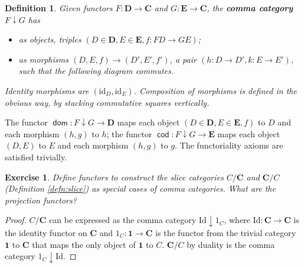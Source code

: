 \documentclass[a5paper,oneside,11pt]{article}
\newtheorem{ex}{Exercise}
\newtheorem{defn}{Definition}
\newcommand\id{\mathord{\mathrm{id}}}
\newcommand\Id{\mathord{\mathrm{Id}}}
\newcommand\1{\mathord{\mathrm{1}}}
\newcommand\cat[1]{\mathbf{#1}}
\newcommand\dom{\mathop{\mathsf{dom}}}
\newcommand\cod{\mathop{\mathsf{cod}}}
\begin{document}
\begin{defn}
\label{defn:comma}
Given functors $F : \cat{D} \longrightarrow \cat{C}$ and $G : \cat{E} \longrightarrow \cat{C}$,
the \textbf{comma category} $F \downarrow G$ has
\begin{itemize}
    \item as objects, triples $(D \in \cat{D}, E \in \cat{E}, f : F D  \rightarrow G E)$;
    \item as morphisms $(D, E, f) \rightarrow (D', E', f')$, a pair
        $(h : D \rightarrow D', k : E \rightarrow E')$, such that the following diagram
        commutes.
        \begin{figure}[H]
            \centering
        \end{figure}
\end{itemize}
Identity morphisms are $(\id_D, \id_E)$.
Composition of morphisms is defined in the obvious way, by stacking commutative
squares vertically.
\end{defn}
The functor $\dom : F \downarrow G \longrightarrow \cat{D}$ maps each object
$(D \in \cat{D}, E \in \cat{E}, f)$ to $D$ and
each morphism $(h, g)$ to $h$; the functor $\cod : F \downarrow G \longrightarrow \cat{E}$
maps each object $(D, E)$ to $E$ and each morphism $(h, g)$ to $g$.
The functoriality axioms are satisfied trivially.

\begin{ex}
    Define functors to construct the slice categories $C/\cat{C}$ and $\cat{C}/C$
    (Definition \ref{defn:slice}) as special cases of comma categories.
    What are the projection functors?
\end{ex}
\begin{proof}
    $C/\cat{C}$ can be expressed as the comma category $\Id \downarrow \1_C$, where
    $\Id : \cat{C} \longrightarrow \cat{C}$ is the identity functor on $\cat{C}$ and
    $\1_C : \cat{1} \longrightarrow \cat{C}$ is the functor from the trivial category
    $\cat{1}$ to $\cat{C}$ that maps the only object of $\cat{1}$ to $C$.
    $\cat{C}/C$ by duality is the comma category $\1_C \downarrow \Id$.
\end{proof}
\end{document}
